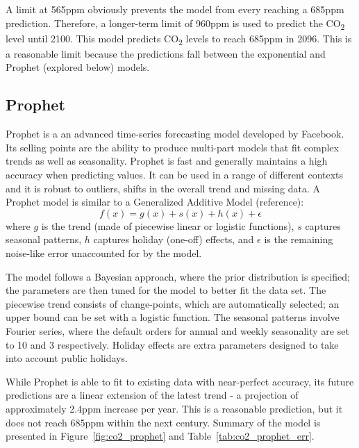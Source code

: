 \documentclass[12pt]{mcmthesis}
\begin{document}
    A limit at 565\si{ppm} obviously prevents the model from every reaching a 685\si{ppm} prediction. Therefore, a longer-term limit of 960\si{ppm} is used to predict the CO\textsubscript{2} level until 2100. This model predicts CO\textsubscript{2} levels to reach 685\si{ppm} in 2096. This is a reasonable limit because the predictions fall between the exponential and Prophet (explored below) models.


    \subsection{Prophet}
    Prophet is a an advanced time-series forecasting model developed by Facebook.
    Its selling points are the ability to produce multi-part models that fit complex trends as well as seasonality.
    Prophet is fast and generally maintains a high accuracy when predicting values.
    It can be used in a range of different contexts and it is robust to outliers, shifts in the overall trend and missing data.
    A Prophet model is similar to a Generalized Additive Model (reference):
%
    \begin{equation}
        f(x) = g(x) + s(x) + h(x) + \epsilon
    \end{equation}
%
    where
    $g$ is the trend (made of piecewise linear or logistic functions),
    $s$ captures seasonal patterns,
    $h$ captures holiday (one-off) effects, and
    $\epsilon$ is the remaining noise-like error unaccounted for by the model.

    The model follows a Bayesian approach, where the prior distribution is specified; the parameters are then tuned for the model to better fit the data set. The piecewise trend consists of change-points, which are automatically selected; an upper bound can be set with a logistic function. The seasonal patterns involve Fourier series, where the default orders for annual and weekly seasonality are set to 10 and 3 respectively. Holiday effects are extra parameters designed to take into account public holidays.

    While Prophet is able to fit to existing data with near-perfect accuracy, its future predictions are a linear extension of the latest trend - a projection of approximately 2.4\si{ppm} increase per year. This is a reasonable prediction, but it does not reach 685\si{ppm} within the next century. Summary of the model is presented in Figure~\ref{fig:co2_prophet} and Table~\ref{tab:co2_prophet_err}.
\end{document}
